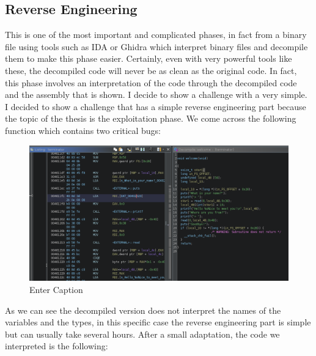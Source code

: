     \subsection{Reverse Engineering}
    This is one of the most important and complicated phases, in fact from a binary file using tools such as IDA or Ghidra which interpret binary files and decompile them to make this phase easier.\newline
    Certainly, even with very powerful tools like these, the decompiled code will never be as clean as the original code.\newline
    In fact, this phase involves an interpretation of the code through the decompiled code and the assembly that is shown.
    I decide to show a challenge with a very simple.
    I decided to show a challenge that has a simple reverse engineering part because the topic of the thesis is the exploitation phase.\newline
    We come across the following function which contains two critical bugs:\newline
    \clearpage
    \begin{figure}[htbp]
        \centering
        \includegraphics[width=0.9\linewidth]{Images/terminator_rev.png}
        \caption{Enter Caption}
        \label{fig:enter-label}
    \end{figure}
    As we can see the decompiled version does not interpret the names of the variables and the types, in this specific case the reverse engineering part is simple but can usually take several hours.\newline
    After a small adaptation, the code we interpreted is the following:\newline

